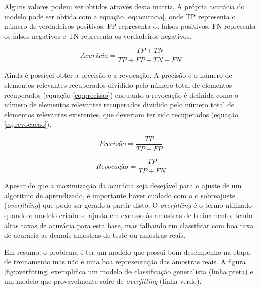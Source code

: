 Alguns valores podem ser obtidos através desta matriz. A própria acurácia do modelo pode ser obtida com a equação \ref{eq:acuracia}, onde TP representa o número de verdadeiros positivos, FP representa os falsos positivos, FN representa os falsos negativos e TN representa os verdadeiros negativos.

\begin{equation}
  Acurácia = \frac{TP+TN}{TP+FP+TN+FN}
\label{eq:acuracia}
\end{equation}

Ainda é possível obter a precisão e a revocação. A precisão é o número de elementos relevantes recuperados dividido pelo número total de elementos recuperados (equação \ref{eq:precisao}) enquanto a revocação é definida como o número de elementos relevantes recuperados dividido pelo número total de elementos relevantes existentes, que deveriam ter sido recuperados (equação \ref{eq:revocacao}).

\begin{equation}
  Precisão = \frac{TP}{TP+FP}
\label{eq:precisao}
\end{equation}


\begin{equation}
  Revocação = \frac{TP}{TP+FN}
\label{eq:revocacao}
\end{equation}

Apesar de que a maximização da acurácia seja desejável para o ajuste de um algoritmo de aprendizado, é importante haver cuidado com o o sobreajuste (\textit{overfitting}) que pode ser gerado a partir disto. O \textit{overfitting} é o termo utilizado quando o modelo criado se ajusta em excesso às amostras de treinamento, tendo altas taxas de acurácia para esta base, mas falhando em classificar com boa taxa de acurácia as demais amostras de teste ou amostras reais.

Em resumo, o problema é ter um modelo que possui bom desempenho na etapa de treinamento mas não é uma boa representação das amostras reais. A figura \ref{fig:overfitting} exemplifica um modelo de classificação generalista (linha preta) e um modelo que provavelmente sofre de \textit{overfitting} (linha verde).

